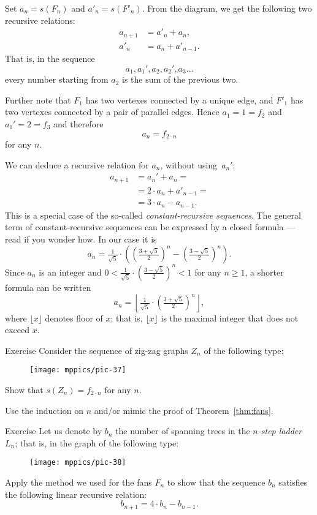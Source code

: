 Set $a_n=s(F_n)$ and $a'_n=s(F'_n)$.
From the diagram, we get the following two recursive relations:
\begin{align*}
a_{n+1}&=a'_n+a_n,
\\
a'_n&=a_n+a'_{n-1}.
\end{align*}
That is, in the sequence 
\[a_1,a_1',a_2,a_2',a_3\dots\]
every number starting from $a_2$ is the sum of the previous two.

Further note that $F_1$ has two vertexes connected by a unique edge,
and  $F'_1$ has two vertexes connected by a pair of parallel edges.
Hence $a_1=1=f_2$ and $a_1'=2=f_3$ and therefore 
\[a_n=f_{2\cdot n}\]
for any $n$.\qeds

We can deduce a recursive relation for $a_n$, without using~$a_n'$:
\begin{align*}
a_{n+1}&=a_n'+a_n=
\\
&=2\cdot a_n+a'_{n-1}=
\\
&=3\cdot a_n-a_{n-1}.
\end{align*}
This is a special case of the so-called \emph{constant-recursive sequences}.
The general term of constant-recursive sequences can be expressed by a closed formula ---
read \cite{jordan} if you wonder how.
In our case it is
\[a_n=\tfrac1{\sqrt{5}}\cdot
\left(
(\tfrac{3+\sqrt{5}}2)^n-(\tfrac{3-\sqrt{5}}2)^n
\right).\]
Since $a_n$ is an integer and $0<\tfrac1{\sqrt{5}}\cdot(\tfrac{3-\sqrt{5}}2)^n<1$ for any $n\ge 1$, a shorter formula can be written
\[a_n
=
\left\lfloor\tfrac1{\sqrt{5}}\cdot(\tfrac{3+\sqrt{5}}2)^n\right\rfloor,\]
where $\lfloor x\rfloor$ denotes floor of $x$; 
that is, $\lfloor x\rfloor$ is the maximal integer that does not exceed $x$.

\begin{thm}{Exercise}
Consider the sequence of zig-zag graphs $Z_n$ of the following type:
\begin{figure}[h!]
\centering
\texttt{[image: mppics/pic-37]}
\end{figure}

Show that $s(Z_n)=f_{2\cdot n}$ for any $n$. 
\end{thm}

 Use the induction on $n$ and/or mimic the proof of Theorem~\ref{thm:fans}.


\begin{thm}{Exercise}
Let us denote by $b_n$ the number of spanning trees in the \label{page:ladder}\emph{$n$-step ladder} $L_n$; that is, in the graph of the following type:

\begin{figure}[h!]
\centering
\texttt{[image: mppics/pic-38]}
\end{figure}

Apply the method we used for the fans $F_n$ to show that the sequence $b_n$ satisfies the following linear recursive relation:
\[b_{n+1}=4\cdot b_n-b_{n-1}.\]

\end{thm}

